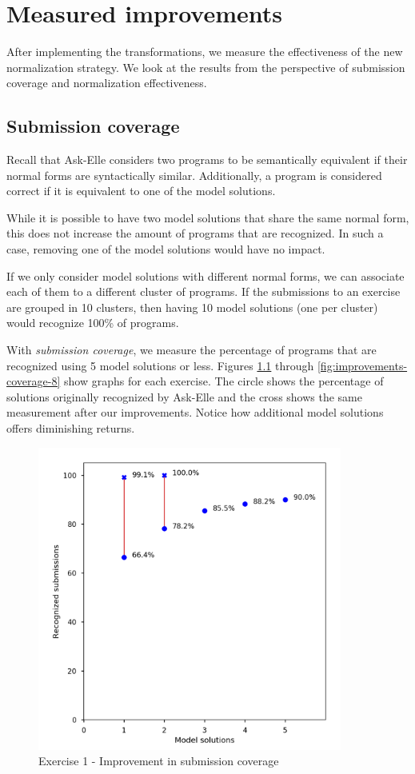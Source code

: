 \chapter{Measured improvements}
\label{sec:improvements}

After implementing the transformations, we measure the effectiveness of the new normalization strategy. We look at the results from the perspective of submission coverage and normalization effectiveness.

\section{Submission coverage}

Recall that Ask-Elle considers two programs to be semantically equivalent if their normal forms are syntactically similar. Additionally, a program is considered correct if it is equivalent to one of the model solutions.

While it is possible to have two model solutions that share the same normal form, this does not increase the amount of programs that are recognized. In such a case, removing one of the model solutions would have no impact.

If we only consider model solutions with different normal forms, we can associate each of them to a different cluster of programs. If the submissions to an exercise are grouped in 10 clusters, then having 10 model solutions (one per cluster) would recognize 100\% of programs.

With \emph{submission coverage}, we measure the percentage of programs that are recognized using 5 model solutions or less. Figures \ref{fig:improvements-coverage-1} through \ref{fig:improvements-coverage-8} show graphs for each exercise. The circle shows the percentage of solutions originally recognized by Ask-Elle and the cross shows the same measurement after our improvements. Notice how additional model solutions offers diminishing returns.

\begin{figure}
\centering
\includegraphics[height=10cm]{graphs/coverage-1.png}
\caption{Exercise 1 - Improvement in submission coverage}
\label{fig:improvements-coverage-1}
\end{figure}

